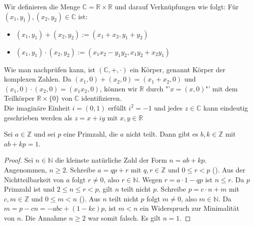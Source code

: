 \begin{example}
	Wir definieren die Menge $\mathbb C = \mathbb R \times \mathbb R$ und darauf Verknüpfungen wie folgt:
	Für $(x_1,y_1), (x_2,y_2) \in \mathbb C$ ist:
	\begin{itemize}
		\item$(x_1,y_1)+(x_2,y_2) := (x_1+x_2,y_1+y_2)$
		\item$(x_1,y_1)\cdot (x_2,y_2) := (x_1x_2-y_1y_2,x_1y_2+x_2y_1)$
	\end{itemize}
	Wie man nachprüfen kann, ist $(\mathbb C,+,\cdot)$ ein Körper, genannt Körper der komplexen Zahlen.
	Da $(x_1,0)+(x_2,0)=(x_1+x_2,0)$ und $(x_1,0)\cdot (x_2,0)=(x_1x_2,0)$, können wir $\mathbb R$ durch
	"'$x=(x,0)$"' mit dem Teilkörper $\mathbb R \times \{0\}$ von $\mathbb C$ identifizieren. \\
	Die imaginäre Einheit $i=(0,1)$ erfüllt $i^2=-1$ und jedes $z \in \mathbb C$ kann eindeutig geschrieben
	werden als $z=x+iy$ mit $x,y \in \mathbb R$
\end{example}


\begin{lemma}
	Sei $a \in \mathbb Z$ und sei $p$ eine Primzahl, die $a$ nicht teilt. Dann gibt es $b,k \in
	\mathbb Z$ mit $ab+kp=1$.
\end{lemma}
\begin{proof}
	Sei $n \in \mathbb N$ die kleinste natürliche Zahl der Form $n=ab+kp$. Angenommen, $n \ge 2$. Schreibe
	$a=qp+r$ mit $q,r \in \mathbb Z$ und $0 \le r < p$ (). Aus der Nichtteilbarkeit von $a$ folgt $r \neq 0$, also 
	$r \in \mathbb N$. Wegen $r=a\cdot 1-qp$ ist $n\le r$. Da $p$ Primzahl ist und $2\le n\le r < p$, gilt $n$ teilt
	nicht $p$. Schreibe $p=c\cdot n+m$ mit $c,m \in \mathbb Z$ und $0 \le m<n$ (). Aus $n$ teilt nicht $p$ folgt
	$m \neq 0$, also $m \in \mathbb N$. Da $m=p-cn=-abc+(1-kc)p$, ist $m<n$ ein Widerspruch zur Minimalität
	von $n$. Die Annahme $n \ge 2$ war somit falsch. Es gilt $n=1$.
\end{proof}

